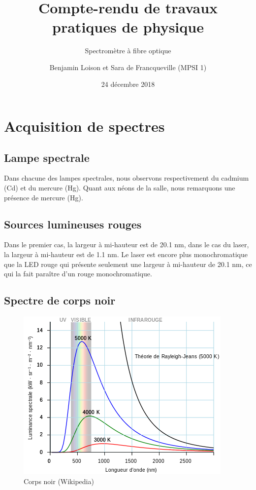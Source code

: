 \documentclass{scrartcl}
\begin{document}
	\title{Compte-rendu de travaux pratiques de physique}
	\subtitle{Spectromètre à fibre optique}
	\author{Benjamin Loison et Sara de Francqueville (MPSI 1)}
	\date{24 décembre 2018}
	\maketitle

  \setcounter{section}{1}
	\section{Acquisition de spectres}

		\subsection{Lampe spectrale}

			Dans chacune des lampes spectrales, nous observons respectivement du cadmium (Cd) et du mercure (Hg). Quant aux néons de la salle, nous remarquons une présence de mercure (Hg).
			
		\subsection{Sources lumineuses rouges}

			Dans le premier cas, la largeur à mi-hauteur est de 20.1 nm, dans le cas du laser, la largeur à mi-hauteur est de 1.1 nm. Le laser est encore plus monochromatique que la LED rouge qui présente seulement une largeur à mi-hauteur de 20.1 nm, ce qui la fait paraître d'un rouge monochromatique.
			
			\subsection{Spectre de corps noir}

				\begin{figure}
					\centering
					\includegraphics[scale=0.75]{Black_body_fr.png}
					\caption{Corps noir (Wikipedia)}
					\label{fig1}
				\end{figure}
			
			
\end{document}
